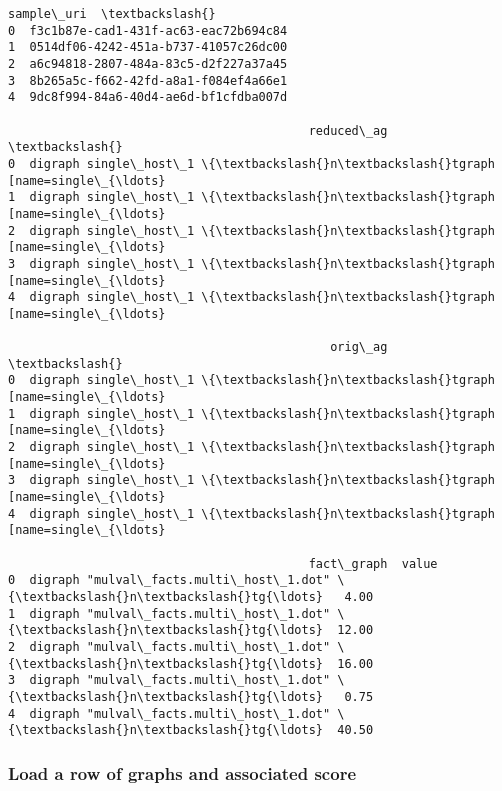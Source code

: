 \documentclass[11pt]{article}
\makeatletter
\newcommand{\boxspacing}{\kern\kvtcb@left@rule\kern\kvtcb@boxsep}
\newcommand{\prompt}[4]{
        \ttfamily\llap{{\color{#2}[#3]:\hspace{3pt}#4}}\vspace{-\baselineskip}
    }
\makeatother
\begin{document}
            \begin{tcolorbox}[breakable, size=fbox, boxrule=.5pt, pad at break*=1mm, opacityfill=0]
\prompt{Out}{outcolor}{9}{\boxspacing}
\begin{Verbatim}[commandchars=\\\{\}]
                             sample\_uri  \textbackslash{}
0  f3c1b87e-cad1-431f-ac63-eac72b694c84
1  0514df06-4242-451a-b737-41057c26dc00
2  a6c94818-2807-484a-83c5-d2f227a37a45
3  8b265a5c-f662-42fd-a8a1-f084ef4a66e1
4  9dc8f994-84a6-40d4-ae6d-bf1cfdba007d

                                          reduced\_ag  \textbackslash{}
0  digraph single\_host\_1 \{\textbackslash{}n\textbackslash{}tgraph [name=single\_{\ldots}
1  digraph single\_host\_1 \{\textbackslash{}n\textbackslash{}tgraph [name=single\_{\ldots}
2  digraph single\_host\_1 \{\textbackslash{}n\textbackslash{}tgraph [name=single\_{\ldots}
3  digraph single\_host\_1 \{\textbackslash{}n\textbackslash{}tgraph [name=single\_{\ldots}
4  digraph single\_host\_1 \{\textbackslash{}n\textbackslash{}tgraph [name=single\_{\ldots}

                                             orig\_ag  \textbackslash{}
0  digraph single\_host\_1 \{\textbackslash{}n\textbackslash{}tgraph [name=single\_{\ldots}
1  digraph single\_host\_1 \{\textbackslash{}n\textbackslash{}tgraph [name=single\_{\ldots}
2  digraph single\_host\_1 \{\textbackslash{}n\textbackslash{}tgraph [name=single\_{\ldots}
3  digraph single\_host\_1 \{\textbackslash{}n\textbackslash{}tgraph [name=single\_{\ldots}
4  digraph single\_host\_1 \{\textbackslash{}n\textbackslash{}tgraph [name=single\_{\ldots}

                                          fact\_graph  value
0  digraph "mulval\_facts.multi\_host\_1.dot" \{\textbackslash{}n\textbackslash{}tg{\ldots}   4.00
1  digraph "mulval\_facts.multi\_host\_1.dot" \{\textbackslash{}n\textbackslash{}tg{\ldots}  12.00
2  digraph "mulval\_facts.multi\_host\_1.dot" \{\textbackslash{}n\textbackslash{}tg{\ldots}  16.00
3  digraph "mulval\_facts.multi\_host\_1.dot" \{\textbackslash{}n\textbackslash{}tg{\ldots}   0.75
4  digraph "mulval\_facts.multi\_host\_1.dot" \{\textbackslash{}n\textbackslash{}tg{\ldots}  40.50
\end{Verbatim}
\end{tcolorbox}
        
    \subsubsection{Load a row of graphs and associated
score}\label{load-a-row-of-graphs-and-associated-score}
\end{document}
